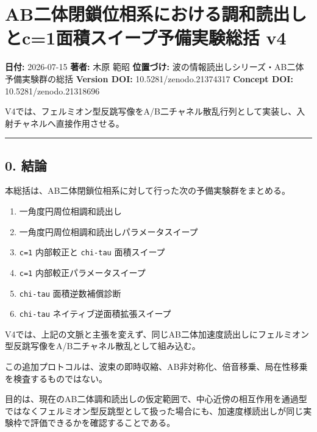 \documentclass[
]{article}
\author{}
\date{}
\providecommand{\tightlist}{%
  \setlength{\itemsep}{0pt}\setlength{\parskip}{0pt}}
\begin{document}
\section{AB二体閉鎖位相系における調和読出しとc=1面積スイープ予備実験総括
v4}\label{abux4e8cux4f53ux9589ux9396ux4f4dux76f8ux7cfbux306bux304aux3051ux308bux8abfux548cux8aadux51faux3057ux3068c1ux9762ux7a4dux30b9ux30a4ux30fcux30d7ux4e88ux5099ux5b9fux9a13ux7dcfux62ec-v4}

\textbf{日付:} 2026-07-15 \textbf{著者:} 木原 範昭 \textbf{位置づけ:}
波の情報読出しシリーズ・AB二体予備実験群の総括 \textbf{Version DOI:}
10.5281/zenodo.21374317 \textbf{Concept DOI:} 10.5281/zenodo.21318696

V4では、フェルミオン型反跳写像をA/B二チャネル散乱行列として実装し、入射チャネルへ直接作用させる。

\begin{center}\rule{0.5\linewidth}{0.5pt}\end{center}

\subsection{0. 結論}\label{ux7d50ux8ad6}

本総括は、AB二体閉鎖位相系に対して行った次の予備実験群をまとめる。

\begin{enumerate}
\def\labelenumi{\arabic{enumi}.}
\tightlist
\item
  一角度円周位相調和読出し
\item
  一角度円周位相調和読出しパラメータスイープ
\item
  \texttt{c=1} 内部較正と \texttt{chi-tau} 面積スイープ
\item
  \texttt{c=1} 内部較正パラメータスイープ
\item
  \texttt{chi-tau} 面積逆数補償診断
\item
  \texttt{chi-tau} ネイティブ逆面積拡張スイープ
\end{enumerate}

V4では、上記の文脈と主張を変えず、同じAB二体加速度読出しにフェルミオン型反跳写像をA/B二チャネル散乱として組み込む。

この追加プロトコルは、波束の即時収縮、AB非対称化、倍音移乗、局在性移乗を検査するものではない。

目的は、現在のAB二体調和読出しの仮定範囲で、中心近傍の相互作用を通過型ではなくフェルミオン型反跳型として扱った場合にも、加速度様読出しが同じ実験枠で評価できるかを確認することである。
\end{document}
